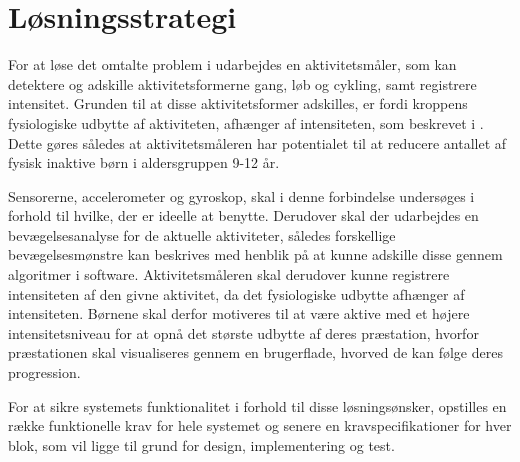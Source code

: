 \section{Løsningsstrategi}

For at løse det omtalte problem i  udarbejdes en aktivitetsmåler, som kan detektere og adskille aktivitetsformerne gang, løb og cykling, samt registrere intensitet. Grunden til at disse aktivitetsformer adskilles, er fordi kroppens fysiologiske udbytte af aktiviteten, afhænger af intensiteten, som beskrevet i . Dette gøres således at aktivitetsmåleren har potentialet til at reducere antallet af fysisk inaktive børn i aldersgruppen 9-12 år.

Sensorerne, accelerometer og gyroskop, skal i denne forbindelse undersøges i forhold til hvilke, der er ideelle at benytte. Derudover skal der udarbejdes en bevægelsesanalyse for de aktuelle aktiviteter, således forskellige bevægelsesmønstre kan beskrives med henblik på at kunne adskille disse gennem algoritmer i software. Aktivitetsmåleren skal derudover kunne registrere intensiteten af den givne aktivitet, da det fysiologiske udbytte afhænger af intensiteten. Børnene skal derfor motiveres til at være aktive med et højere intensitetsniveau for at opnå det største udbytte af deres præstation, hvorfor præstationen skal visualiseres gennem en brugerflade, hvorved de kan følge deres progression.

For at sikre systemets funktionalitet i forhold til disse løsningsønsker, opstilles en række funktionelle krav for hele systemet og senere en kravspecifikationer for hver blok, som vil ligge til grund for design, implementering og test. 




